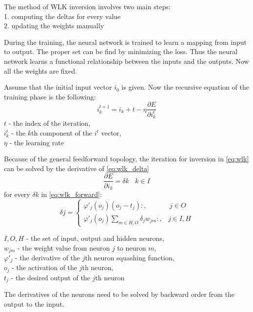 \noindent The method of WLK inversion involves two main steps: \\
1. computing the deltas for every value \\
2. updating the weights manually\medskip

During the training, the neural network is trained to learn a mapping from input to output. The proper set can be find by minimizing the loss. Thus the neural network learns a functional relationship between the inputs and the outputs. Now all the weights are fixed. \medskip

Assume that the initial input vector $i_0$ is given. Now the recursive equation of the training phase is the following: 
\begin{equation} i_k^{t+1} = i_k+t - \eta \frac{\partial E}{\partial i_k^t} \label{eq:wlk} \end{equation} 
$t$ - the index of the iteration, \\
$i_k^t$ - the $k$th component of the $i^t$ vector, \\
$\eta$ - the learning rate \bigskip

Because of the general feedforward topology, the iteration for inversion in \eqref{eq:wlk} can be solved by the derivative of \eqref{eq:wlk_delta}
\begin{equation} \frac{\partial E}{\partial i_k} = \delta k ~~~~ k \in I \label{eq:wlk_delta} \end{equation}
for every $\delta k$ in \eqref{eq:wlk_forward}:
\begin{equation} \delta j = \begin{cases} \varphi'_j(o_j)(o_j-t_j):, & ~ j \in O \\ 
\varphi'_j(o_j)\sum_{m\in H,O}\delta_j w_{jm}:, & j \in I, H \end{cases} \label{eq:wlk_forward} \end{equation}

\noindent $I, O, H$ - the set of input, output and hidden neurons,\\
$w_{jm}$ - the weight value from neuron $j$ to neuron $m$,\\
$\varphi'_j$ - the derivative of the $j$th neuron squashing function,\\
$o_j$ - the activation of the $j$th neuron,\\
$t_j$ - the desired output of the $j$th neuron \bigskip

The derivatives of the neurons need to be solved by backward order from the output to the input.

